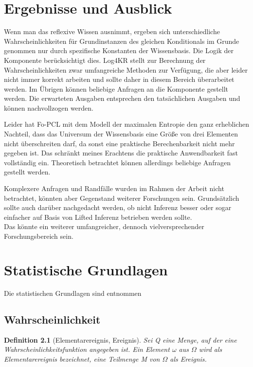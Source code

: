 \documentclass[a4paper, 11pt]{book}
\newtheorem{Def}{Definition }[section]
\begin{document}
{\begin{itemize}
	
\end{itemize}




\chapter{Ergebnisse und Ausblick}\label{Erg}
Wenn man das reflexive Wissen ausnimmt, ergeben sich unterschiedliche Wahrscheinlichkeiten für Grundinstanzen des gleichen Konditionals im Grunde genommen nur durch spezifische Konstanten der Wissensbasis. Die Logik der Komponente berücksichtigt dies. Log4KR stellt zur Berechnung der Wahrscheinlichkeiten zwar umfangreiche Methoden zur Verfügung, die aber leider nicht immer korrekt arbeiten und sollte daher in diesem Bereich überarbeitet werden. Im Übrigen können beliebige Anfragen an die Komponente gestellt werden. Die erwarteten Ausgaben entsprechen den tatsächlichen Ausgaben und können nachvollzogen werden. 

Leider hat Fo-PCL mit dem Modell der maximalen Entropie den ganz erheblichen Nachteil, dass das Universum der Wissensbasis eine Größe von drei Elementen nicht überschreiten darf, da sonst eine praktische Berechenbarkeit nicht mehr gegeben ist. Das schränkt meines Erachtens die praktische Anwendbarkeit fast vollständig ein. Theoretisch betrachtet können allerdings beliebige Anfragen gestellt werden.

Komplexere Anfragen und Randfälle wurden im Rahmen der Arbeit nicht betrachtet, könnten aber Gegenstand weiterer Forschungen sein. Grundsätzlich sollte auch darüber nachgedacht werden, ob nicht Inferenz besser oder sogar einfacher auf Basis von Lifted Inferenz betrieben werden sollte.\\
Das könnte ein weiterer umfangreicher, dennoch vielversprechender Forschungsbereich sein. 




\appendix{}

\chapter{Statistische Grundlagen}
Die statistischen Grundlagen sind \cite{BKI08} entnommen
\section{Wahrscheinlichkeit} 


\begin{Def}[Elementarereignis, Ereignis] 
Sei Q eine Menge, auf der eine Wahrscheinlichkeitsfunktion angegeben ist. Ein Element $\omega$ aus $\Omega$ wird als Elementarereignis bezeichnet, eine Teilmenge M von $\Omega$ als Ereignis.\\
\end{Def}

}
\end{document}
